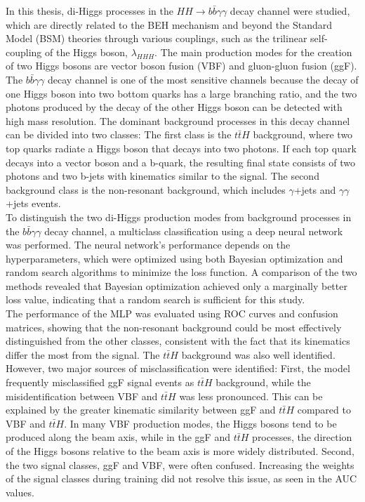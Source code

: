 \label{sec:conclusion}

In this thesis, di-Higgs processes in the $HH \rightarrow b \bar{b} \gamma \gamma$ decay channel were studied, which are directly related to the BEH mechanism and beyond the Standard Model (BSM)
theories through various couplings, such as the trilinear self-coupling of the Higgs boson, $\lambda_{HHH}$. The main production modes for the creation of two Higgs bosons are vector boson fusion (VBF)
and gluon-gluon fusion (ggF). \\

The $b \bar{b} \gamma \gamma$ decay channel is one of the most sensitive channels because the decay of one Higgs boson into two bottom quarks has a large branching ratio, and the two photons produced by the decay of the other Higgs boson
can be detected with high mass resolution. The dominant background processes in this decay channel can be divided into two classes: The first class is the $t \bar{t} H$ background, where two top quarks radiate a Higgs boson that
decays into two photons. If each top quark decays into a vector boson and a b-quark, the resulting final state consists of two photons and two b-jets with kinematics similar to the signal.
The second background class is the non-resonant background, which includes $\gamma$+jets and $\gamma\gamma$+jets events. \\

To distinguish the two di-Higgs production modes from background processes in the $b \bar{b} \gamma \gamma$ decay channel, a multiclass classification using a deep neural network was performed.
The neural network's performance depends on the hyperparameters, which were optimized using both Bayesian optimization and random search algorithms to minimize the loss function.
A comparison of the two methods revealed that Bayesian optimization achieved only a marginally better loss value, indicating that a random search is sufficient for this study. \\

The performance of the MLP was evaluated using ROC curves and confusion matrices, showing that the non-resonant background could be most effectively distinguished from the other classes, consistent with
the fact that its kinematics differ the most from the signal. The $t \bar{t} H$ background was also well identified. However, two major sources of
misclassification were identified: First, the model frequently misclassified ggF signal events as $t \bar{t} H$ background, while the misidentification between VBF and $t \bar{t} H$ was less pronounced. This can be explained by the greater kinematic similarity between ggF and $t \bar{t} H$ compared to VBF and $t \bar{t} H$. 
In many VBF production modes, the Higgs bosons tend to be produced along the beam axis, while in the ggF and $t \bar{t} H$ processes, the direction of the Higgs bosons relative to the beam axis
is more widely distributed. Second, the two signal classes, ggF and VBF, were often confused. Increasing the weights of the signal classes during training did not resolve this issue, as seen in the AUC values. \\

